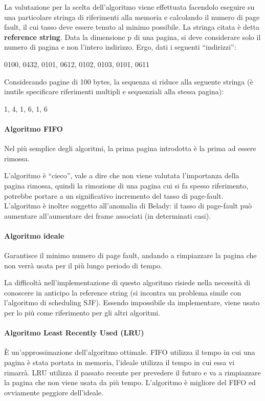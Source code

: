\documentclass[a4paper]{article}
\begin{document}
La valutazione per la scelta dell'algoritmo viene effettuata facendolo eseguire su una particolare stringa di riferimenti alla memoria e calcolando il numero di page fault, il cui tasso deve essere tenuto al minimo possibile. La stringa citata è detta \textbf{reference string}. Data la dimensione p di una pagina, si deve considerare solo il numero di pagina e non l'intero indirizzo. Ergo, dati i seguenti ``indirizzi'':

0100, 0432, 0101, 0612, 0102, 0103, 0101, 0611

Considerando pagine di 100 bytes, la sequenza si riduce alla seguente stringa (è inutile specificare riferimenti multipli e sequenziali alla stessa pagina):

1, 4, 1, 6, 1, 6

\paragraph{Algoritmo FIFO}
Nel più semplice degli algoritmi, la prima pagina introdotta è la prima ad essere rimossa.

L'algoritmo è ``cieco'', vale a dire che non viene valutata l'importanza della pagina rimossa, quindi la rimozione di una pagina cui si fa spesso riferimento, potrebbe portare a un significativo incremento del tasso di page-fault. L'algoritmo è inoltre soggetto all'anomalia di Belady: il tasso di page-fault può aumentare all'aumentare dei frame associati (in determinati casi).

\paragraph{Algoritmo ideale}
Garantisce il minimo numero di page fault, andando a rimpiazzare la pagina che non verrà usata per il più lungo periodo di tempo.

La difficoltà nell'implementazione di questo algoritmo risiede nella necessità di conoscere in anticipo la reference string (si incontra un problema simile con l'algoritmo di scheduling SJF). Essendo impossibile da implementare, viene usato per lo più come riferimento per gli altri algoritmi.

\paragraph{Algoritmo Least Recently Used (LRU)} È un'approssimazione dell'algoritmo ottimale. FIFO utilizza il tempo in cui una pagina è stata portata in memoria, l'ideale utilizza il tempo in cui essa vi rimarrà. LRU utilizza il passato recente per prevedere il futuro e va a rimpiazzare la pagina che non viene usata da più tempo. L'algoritmo è migliore del FIFO ed ovviamente peggiore dell'ideale.
\end{document}
